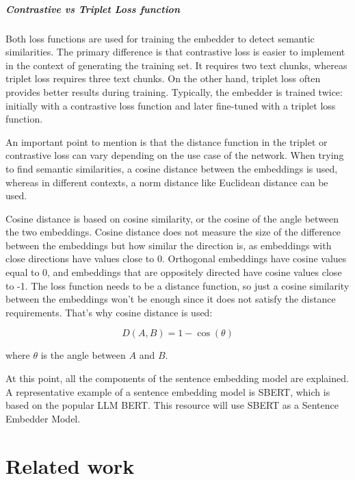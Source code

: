 \documentclass{wseas}
\begin{document}
\subparagraph{Contrastive vs Triplet Loss function}

Both loss functions are used for training the embedder to detect
semantic similarities. The primary difference is that contrastive loss
is easier to implement in the context of generating the training set. It
requires two text chunks, whereas triplet loss requires three text
chunks. On the other hand, triplet loss often provides better results
during training. Typically, the embedder is trained twice: initially
with a contrastive loss function and later fine-tuned with a triplet
loss function.

An important point to mention is that the distance function in the
triplet or contrastive loss can vary depending on the use case of the
network. When trying to find semantic similarities, a cosine distance
between the embeddings is used, whereas in different contexts, a norm
distance like Euclidean distance can be used.

Cosine distance is based on cosine similarity, or the cosine of the
angle between the two embeddings. Cosine distance does not measure the
size of the difference between the embeddings but how similar the
direction is, as embeddings with close directions have values close to
0. Orthogonal embeddings have cosine values equal to 0, and embeddings
that are oppositely directed have cosine values close to -1. The loss
function needs to be a distance function, so just a cosine similarity
between the embeddings won't be enough since it does not satisfy the
distance requirements. That's why cosine distance is used:


\begin{equation}
  D(A, B) = 1 - \cos(\theta)
\end{equation}

where \(\theta\) is the angle between \(A\) and \(B\).

At this point, all the components of the sentence embedding model are
explained. A representative example of a sentence embedding model is
SBERT, which is based on the popular LLM BERT. This resource will use
SBERT as a Sentence Embedder Model.


\section{Related work}
\end{document}
